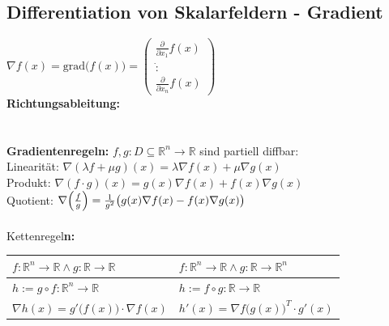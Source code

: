\documentclass[6pt,a4paper]{scrartcl}
\let\olddot = \dot
\newcommand{\norm}[1]{\ensuremath{\|#1\|}}                                                      %
\newcommand{\svdots}{\ensuremath{\olddot :}}                                                    %
\renewcommand{\vec}[1]{\ensuremath{\boldsymbol {#1}}}                                           %
\renewcommand{\emph}[1]{\textbf{#1}}                                                            %
\renewcommand*{\dot}[1]{\accentset{\mbox{\textrm{\large\bfseries .}} }{#1}}                     %
\begin{document}
\begin{multicols*}{4}
    \subsection{Differentiation von Skalarfeldern - Gradient}
    $\nabla f(x) = \mathrm{grad} \bigl( f(x) \bigr) = \begin{pmatrix}  \frac{\partial}{\partial x_1} f(x) \\ \svdots \\ \frac{\partial}{\partial x_n} f(x) \end{pmatrix}$\\
    \emph{Richtungsableitung:} \boxed { \partial_{\vec v} f(x) = \left\langle \nabla f(x), \vec v \right\rangle } \quad \boxed{ \norm{\vec v}=1 }\\
    \\
    \\
    \textbf{Gradientenregeln:} $f,g:D \subseteq \mathbb R^n \rightarrow \mathbb R$ sind partiell diffbar:\\
    Linearität: $\nabla(\lambda f + \mu g) (x) = \lambda \nabla f(x) + \mu \nabla g(x)$\\
    Produkt: $\nabla (f \cdot g) (x) = g(x) \nabla f(x) + f(x) \nabla g(x)$\\
    Quotient: $\nabla \Bigl( \frac{f}{g} \Bigr) = \frac{1}{g^2} \bigl( g(x)\nabla f(x) - f(x) \nabla g(x) \bigr)$\\
    \\
    Kettenregel\textbf{n:}\\
    \begin{tabular}{l|l}
        $f:\mathbb R^n \rightarrow \mathbb R \land g:\mathbb R \rightarrow \mathbb R$ & $f:\mathbb R^n \rightarrow \mathbb R \land g:\mathbb R \rightarrow \mathbb R^n$ \\ \midrule
        $h:= g \circ f: \mathbb R^n \rightarrow \mathbb R$                            & $h:= f \circ g: \mathbb R \rightarrow \mathbb R$                                \\
        $\boxed{ \nabla h(x) = g'\big( f(x) \big) \cdot \nabla f(x)}$                 & $\boxed{h'(x)=\nabla f\big( g(x) \big)^T \cdot g'(x)}$
    \end{tabular}



\end{multicols*}
\end{document}
